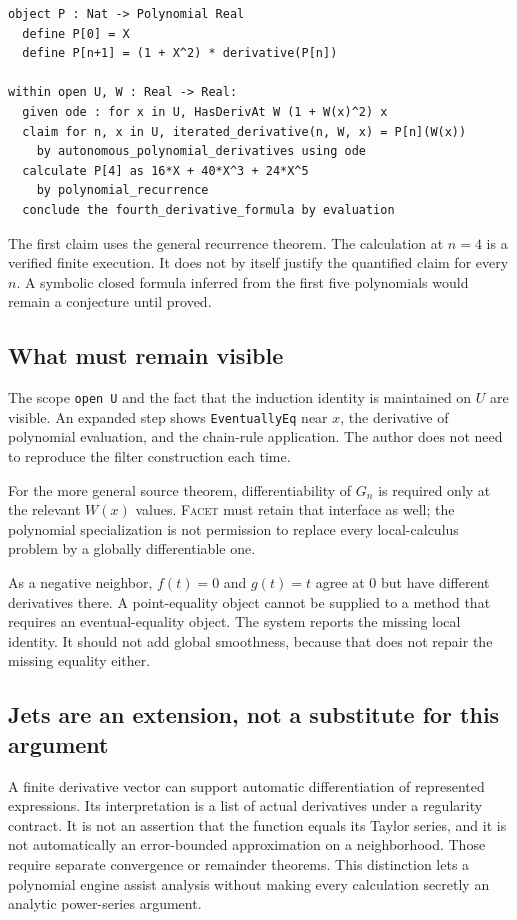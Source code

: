 \documentclass[11pt,letterpaper]{article}
\newcommand{\code}[1]{\nolinkurl{#1}}
\newcommand{\Facet}{\textsc{Facet}}
\numberwithin{equation}{section}
\begin{document}
\par\noindent\begin{minipage}{\linewidth}
\begin{lstlisting}
object P : Nat -> Polynomial Real
  define P[0] = X
  define P[n+1] = (1 + X^2) * derivative(P[n])

within open U, W : Real -> Real:
  given ode : for x in U, HasDerivAt W (1 + W(x)^2) x
  claim for n, x in U, iterated_derivative(n, W, x) = P[n](W(x))
    by autonomous_polynomial_derivatives using ode
  calculate P[4] as 16*X + 40*X^3 + 24*X^5
    by polynomial_recurrence
  conclude the fourth_derivative_formula by evaluation
\end{lstlisting}
\end{minipage}\par


The first claim uses the general recurrence theorem. The calculation at $n=4$
is a verified finite execution. It does not by itself justify the quantified
claim for every $n$. A symbolic closed formula inferred from the first five
polynomials would remain a conjecture until proved.

\subsection{What must remain visible}
The scope \code{open U} and the fact that the induction identity is maintained
on $U$ are visible. An expanded step shows
\code{EventuallyEq} near $x$, the derivative of polynomial evaluation, and the
chain-rule application. The author does not need to reproduce the filter
construction each time.

For the more general source theorem, differentiability of $G_n$ is required
only at the relevant $W(x)$ values. \Facet{} must retain that interface as well;
the polynomial specialization is not permission to replace every local-calculus
problem by a globally differentiable one.

As a negative neighbor, $f(t)=0$ and $g(t)=t$ agree at $0$ but have different
derivatives there. A point-equality object cannot be supplied to a method that
requires an eventual-equality object. The system reports the missing local
identity. It should not add global smoothness, because that does not repair the
missing equality either.

\subsection{Jets are an extension, not a substitute for this argument}
A finite derivative vector can support automatic differentiation of represented
expressions. Its interpretation is a list of actual derivatives under a regularity
contract. It is not an assertion that the function equals its Taylor series,
and it is not automatically an error-bounded approximation on a neighborhood.
Those require separate convergence or remainder theorems. This distinction lets
a polynomial engine assist analysis without making every calculation secretly
an analytic power-series argument.
\end{document}
